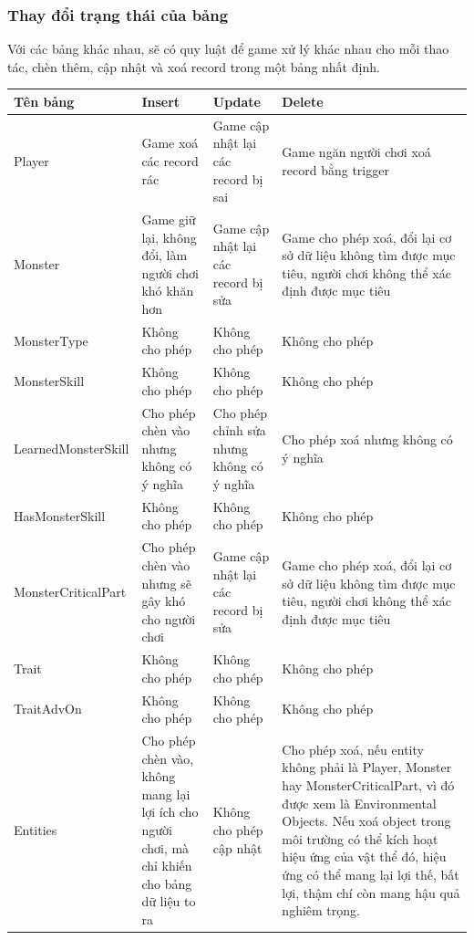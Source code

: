 \subsubsection{Thay đổi trạng thái của bảng}
Với các bảng khác nhau, sẽ có quy luật để game xử lý khác nhau cho mỗi thao tác, chèn thêm, cập nhật và xoá record trong một bảng nhất định.
\begin{longtable}{|p{3cm}|p{3cm}|p{3cm}|p{3cm}|}	
	\hline
	\textbf{Tên bảng} & \textbf{Insert} & \textbf{Update} & \textbf{Delete}\\
	\hline
	\endhead
	
	\hline
	\endfoot
	
	\hline
	Player & Game xoá các record rác & Game cập nhật lại các record bị sai & Game ngăn người chơi xoá record bằng trigger\\
	\hline
	Monster & Game giữ lại, không đổi, làm người chơi khó khăn hơn & Game cập nhật lại các record bị sửa & Game cho phép xoá, đổi lại cơ sở dữ liệu không tìm được mục tiêu, người chơi không thể xác định được mục tiêu\\
	\hline
	MonsterType & Không cho phép & Không cho phép & Không cho phép\\
	\hline
	MonsterSkill & Không cho phép & Không cho phép & Không cho phép\\
	\hline
	LearnedMonsterSkill & Cho phép chèn vào nhưng không có ý nghĩa & Cho phép chỉnh sửa nhưng không có ý nghĩa & Cho phép xoá nhưng không có ý nghĩa\\
	\hline
	HasMonsterSkill & Không cho phép & Không cho phép & Không cho phép\\
	\hline
	MonsterCriticalPart & Cho phép chèn vào nhưng sẽ gây khó cho người chơi & Game cập nhật lại các record bị sửa & Game cho phép xoá, đổi lại cơ sở dữ liệu không tìm được mục tiêu, người chơi không thể xác định được mục tiêu\\
	\hline
	Trait & Không cho phép & Không cho phép & Không cho phép\\
	\hline
	TraitAdvOn & Không cho phép & Không cho phép & Không cho phép\\
	\hline
	Entities & Cho phép chèn vào, không mang lại lợi ích cho người chơi, mà chỉ khiến cho bảng dữ liệu to ra & Không cho phép cập nhật & Cho phép xoá, nếu entity không phải là Player, Monster hay MonsterCriticalPart, vì đó được xem là Environmental Objects. Nếu xoá object trong môi trường có thể kích hoạt hiệu ứng của vật thể đó, hiệu ứng có thể mang lại lợi thế, bất lợi, thậm chí còn mang hậu quả nghiêm trọng.\\

\end{longtable}
